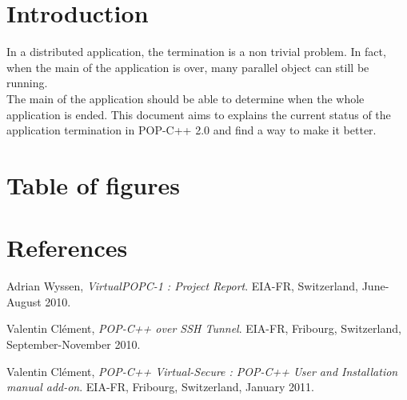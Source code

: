 \documentclass[a4paper, 11pt]{article}
\begin{document}




\tableofcontents
\pagebreak
\section{Introduction}
In a distributed application, the termination is a non trivial problem. In fact, when the main of the application is over, many parallel object can still be running. \\
The main of the application should be able to determine when the whole application is ended. This document aims to explains the current status of the application termination in POP-C++ 2.0 and find a way to make it better. 



\pagebreak


\pagebreak
\section{Table of figures}
\listoffigures{}





%
%

\section{References}
\begin{thebibliography}{9}
	Adrian Wyssen,
  	\emph{VirtualPOPC-1 : Project Report}.
	EIA-FR, Switzerland, 
	June-August 2010.
	
	Valentin Clément,
	\emph{POP-C++ over SSH Tunnel}.
	EIA-FR, Fribourg, Switzerland,
	September-November 2010.
	
	Valentin Clément,
	\emph{POP-C++ Virtual-Secure : POP-C++ User and Installation manual add-on}.
	EIA-FR, Fribourg, Switzerland, 
	January 2011.

\end{thebibliography}
\end{document}

